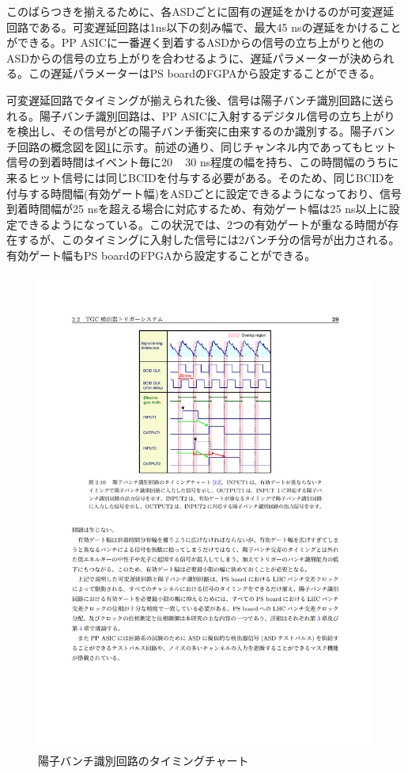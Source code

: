     このばらつきを揃えるために、各ASDごとに固有の遅延をかけるのが可変遅延回路である。可変遅延回路は1ns以下の刻み幅で、最大45 nsの遅延をかけることができる。PP ASICに一番遅く到着するASDからの信号の立ち上がりと他のASDからの信号の立ち上がりを合わせるように、遅延パラメーターが決められる。この遅延パラメーターはPS boardのFGPAから設定することができる。

    可変遅延回路でタイミングが揃えられた後、信号は陽子バンチ識別回路に送られる。陽子バンチ識別回路は、PP ASICに入射するデジタル信号の立ち上がりを検出し、その信号がどの陽子バンチ衝突に由来するのか識別する。陽子バンチ回路の概念図を図\ref{TGC_BCID}に示す。前述の通り、同じチャンネル内であってもヒット信号の到着時間はイベント毎に20 ~ 30 ns程度の幅を持ち、この時間幅のうちに来るヒット信号には同じBCIDを付与する必要がある。そのため、同じBCIDを付与する時間幅(有効ゲート幅)をASDごとに設定できるようになっており、信号到着時間幅が25 nsを超える場合に対応するため、有効ゲート幅は25 ns以上に設定できるようになっている。この状況では、2つの有効ゲートが重なる時間が存在するが、このタイミングに入射した信号には2バンチ分の信号が出力される。有効ゲート幅もPS boardのFPGAから設定することができる。

    \begin{figure} 
    \centering
    \includegraphics[width=16cm]{fig/Intro/TGC_BCID.pdf}
    \caption[陽子バンチ識別回路のタイミングチャート]{陽子バンチ識別回路のタイミングチャート\cite{mt_takemoto}}
    \label{TGC_BCID}
    \end{figure}

